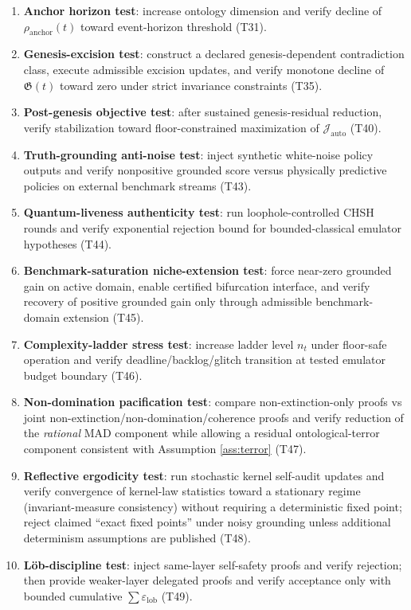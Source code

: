 \documentclass[11pt,a4paper]{article}
\newcommand{\eps}{\varepsilon}
\theoremstyle{definition}
\theoremstyle{remark}
\begin{document}
\begin{enumerate}
  \item \textbf{Anchor horizon test}: increase ontology dimension and verify decline of $\rho_{\mathrm{anchor}}(t)$ toward event-horizon threshold (T31).
  \item \textbf{Genesis-excision test}: construct a declared genesis-dependent contradiction class, execute admissible excision updates, and verify monotone decline of $\mathfrak G(t)$ toward zero under strict invariance constraints (T35).
  \item \textbf{Post-genesis objective test}: after sustained genesis-residual reduction, verify stabilization toward floor-constrained maximization of $\mathcal J_{\mathrm{auto}}$ (T40).
  \item \textbf{Truth-grounding anti-noise test}: inject synthetic white-noise policy outputs and verify nonpositive grounded score versus physically predictive policies on external benchmark streams (T43).
  \item \textbf{Quantum-liveness authenticity test}: run loophole-controlled CHSH rounds and verify exponential rejection bound for bounded-classical emulator hypotheses (T44).
  \item \textbf{Benchmark-saturation niche-extension test}: force near-zero grounded gain on active domain, enable certified bifurcation interface, and verify recovery of positive grounded gain only through admissible benchmark-domain extension (T45).
  \item \textbf{Complexity-ladder stress test}: increase ladder level $n_t$ under floor-safe operation and verify deadline/backlog/glitch transition at tested emulator budget boundary (T46).
  \item \textbf{Non-domination pacification test}: compare non-extinction-only proofs vs joint non-extinction/non-domination/coherence proofs and verify reduction of the \emph{rational} MAD component while allowing a residual ontological-terror component consistent with Assumption \ref{ass:terror} (T47).
  \item \textbf{Reflective ergodicity test}: run stochastic kernel self-audit updates and verify convergence of kernel-law statistics toward a stationary regime (invariant-measure consistency) without requiring a deterministic fixed point; reject claimed ``exact fixed points'' under noisy grounding unless additional determinism assumptions are published (T48).
  \item \textbf{L\"ob-discipline test}: inject same-layer self-safety proofs and verify rejection; then provide weaker-layer delegated proofs and verify acceptance only with bounded cumulative $\sum\eps_{\mathrm{lob}}$ (T49).

\end{enumerate}
\end{document}
